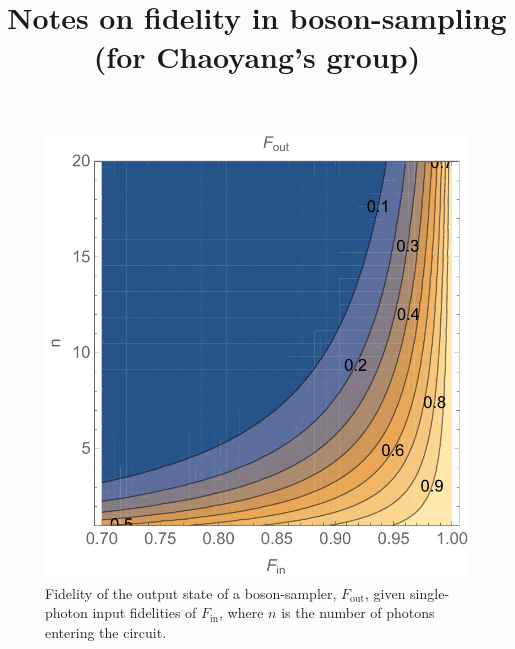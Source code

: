\documentclass[aps,pra,twocolumn,amsmath,amssymb,nofootinbib,superscriptaddress]{revtex4}
\begin{document}


\title{Notes on fidelity in boson-sampling (for Chaoyang's group)}

\frenchspacing

\maketitle

\begin{figure}[!htb]
\includegraphics[width=\columnwidth]{fidelity}
\caption{Fidelity of the output state of a boson-sampler, $F_\mathrm{out}$, given single-photon input fidelities of $F_\mathrm{in}$, where $n$ is the number of photons entering the circuit.} \label{fig:fidelity}
\end{figure}
\end{document}
